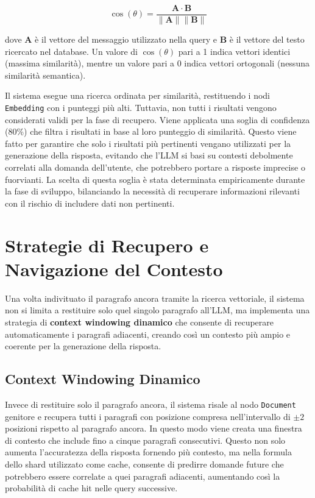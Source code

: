 \begin{equation}
    \cos(\theta) = \frac{\mathbf{A} \cdot \mathbf{B}}{\|\mathbf{A}\| \|\mathbf{B}\|}
    \label{eq:cosine}
\end{equation}

dove $\mathbf{A}$ è il vettore del messaggio utilizzato nella query e $\mathbf{B}$ è il vettore del testo ricercato nel database. Un valore di $\cos(\theta)$ pari a 1 indica vettori identici (massima similarità), mentre un valore pari a 0 indica vettori ortogonali (nessuna similarità semantica).

Il sistema esegue una ricerca ordinata per similarità, restituendo i nodi \texttt{Embedding} con i punteggi più alti. Tuttavia, non tutti i risultati vengono considerati validi per la fase di recupero. Viene applicata una soglia di confidenza (80\%) che filtra i risultati in base al loro punteggio di similarità. Questo viene fatto per garantire che solo i risultati più pertinenti vengano utilizzati per la generazione della risposta, evitando che l'LLM si basi su contesti debolmente correlati alla domanda dell'utente, che potrebbero portare a risposte imprecise o fuorvianti. La scelta di questa soglia è stata determinata empiricamente durante la fase di sviluppo, bilanciando la necessità di recuperare informazioni rilevanti con il rischio di includere dati non pertinenti.

\section{Strategie di Recupero e Navigazione del Contesto}
\label{sec:context_windowing}

Una volta indivituato il paragrafo ancora tramite la ricerca vettoriale, il sistema non si limita a restituire solo quel singolo paragrafo all'LLM, ma implementa una strategia di \textbf{context windowing dinamico} che consente di recuperare automaticamente i paragrafi adiacenti, creando così un contesto più ampio e coerente per la generazione della risposta.

\subsection{Context Windowing Dinamico}

Invece di restituire solo il paragrafo ancora, il sistema risale al nodo \texttt{Document} genitore e recupera tutti i paragrafi con posizione compresa nell'intervallo di $\pm 2$ posizioni rispetto al paragrafo ancora. In questo modo viene creata una finestra di contesto che include fino a cinque paragrafi consecutivi. Questo non solo aumenta l'accuratezza della risposta fornendo più contesto, ma nella formula dello shard utilizzato come cache, consente di predirre domande future che potrebbero essere correlate a quei paragrafi adiacenti, aumentando così la probabilità di cache hit nelle query successive.

